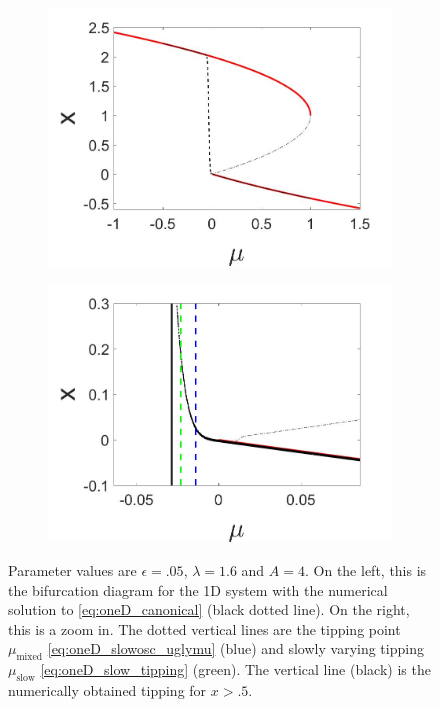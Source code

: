\begin{figure}[H]
\centering
\begin{subfigure}{.5\textwidth}
 \centering
 \includegraphics[width=\linewidth]{oneD/slowosc_bif_diagram_large.jpg}
 \caption{}
\end{subfigure}%
\begin{subfigure}{.5\textwidth}
 \centering
 \includegraphics[width=\linewidth]{oneD/slowosc_bif_diagram_large_zoom.jpg}
 \caption{}
\end{subfigure}
\caption{Parameter values are $\epsilon=.05$, $\lambda=1.6$ and $A=4$. On the left, this is the bifurcation diagram for the 1D system with the numerical solution to \eqref{eq:oneD_canonical} (black dotted line). On the right, this is a zoom in. The dotted vertical lines are the tipping point $\mu_{\text{mixed}}$ \eqref{eq:oneD_slowosc_uglymu} (blue) and slowly varying tipping $\mu_{\text{slow}}$ \eqref{eq:oneD_slow_tipping} (green). The vertical line (black) is the numerically obtained tipping for $x>.5$.}
\label{fig:oneD_slowosc_numerical_large}
\end{figure}

